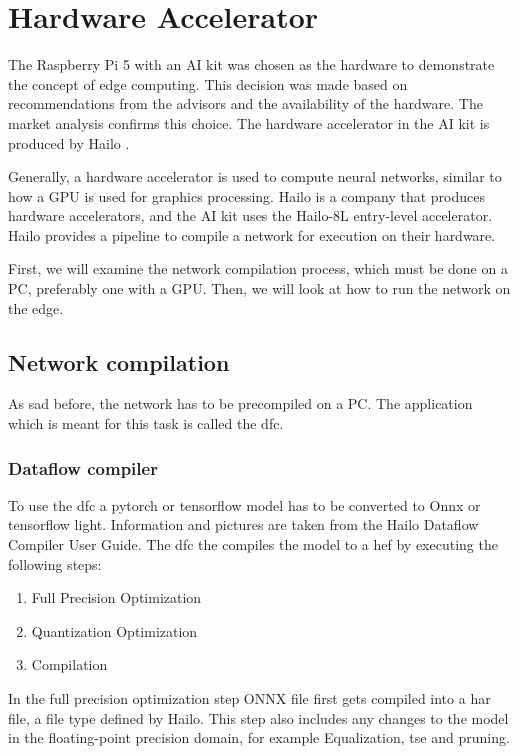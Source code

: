 \chapter{Hardware Accelerator}

The Raspberry Pi 5 with an AI kit was chosen as the hardware to demonstrate the concept of edge computing. This decision was made based on recommendations from the advisors and the availability of the hardware. The market analysis confirms this choice. The hardware accelerator in the AI kit is produced by Hailo \cite{hailo}.

Generally, a hardware accelerator is used to compute neural networks, similar to how a GPU is used for graphics processing. Hailo is a company that produces hardware accelerators, and the AI kit uses the Hailo-8L entry-level accelerator. Hailo provides a pipeline to compile a network for execution on their hardware.

First, we will examine the network compilation process, which must be done on a PC, preferably one with a GPU. Then, we will look at how to run the network on the edge.


\section{Network compilation}
As sad before, the network has to be precompiled on a PC.
The application which is meant for this task is called the \Acrfull{dfc}.

\subsection{Dataflow compiler
\label{section:dfc}}

To use the \acrshort{dfc} a pytorch or tensorflow model has to be converted to Onnx or tensorflow light.
Information and pictures are taken from the Hailo Dataflow Compiler User Guide\cite{hailo_dataflow_compiler}.
The \acrshort{dfc} the compiles the model to a \Acrfull{hef} by executing the following steps:

\begin{enumerate}
    \item Full Precision Optimization
    \item Quantization Optimization
    \item Compilation
\end{enumerate}
In the full precision optimization step ONNX file first gets compiled into a \acrfull{har} file, a file type defined by Hailo.
This step also includes any changes to the model in the floating-point precision domain, for example Equalization\cite{meller2019same}, \acrshort{tse}\cite{Vosco_2021_ICCV} and pruning.


